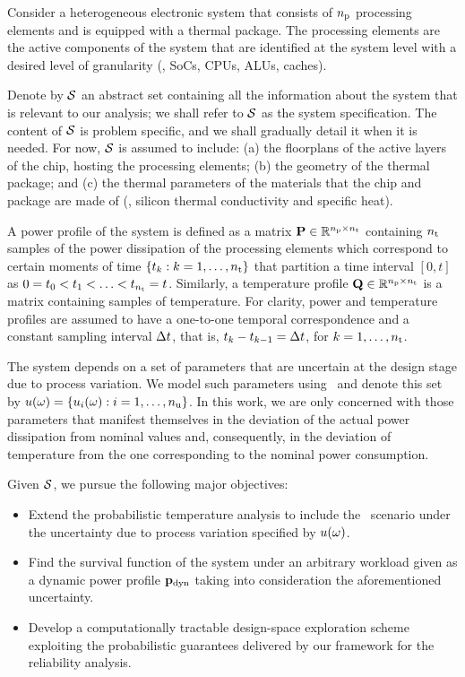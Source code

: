 Consider a heterogeneous electronic system that consists of ${n_\text{p}}$ processing elements and is equipped with a thermal package.
The processing elements are the active components of the system that are identified at the system level with a desired level of granularity (\eg, SoCs, CPUs, ALUs, caches).

Denote by $\mathcal{S}$ an abstract set containing all the information about the system that is relevant to our analysis; we shall refer to $\mathcal{S}$ as the system specification.
The content of $\mathcal{S}$ is problem specific, and we shall gradually detail it when it is needed.
For now, $\mathcal{S}$ is assumed to include: (a) the floorplans of the active layers of the chip, hosting the processing elements; (b) the geometry of the thermal package; and (c) the thermal parameters of the materials that the chip and package are made of (\eg, silicon thermal conductivity and specific heat).

A power profile of the system is defined as a matrix $\mathbf{P} \in \mathbb{R}^{{n_\text{p}} \times {n_\text{t}}}$ containing ${n_\text{t}}$ samples of the power dissipation of the processing elements which correspond to certain moments of time $\{ t_k: k = 1, \dots, {n_\text{t}} \}$ that partition a time interval $[0, t]$ as $0 = t_0 < t_1 < \dotsc < t_{n_\text{t}} = t$.
Similarly, a temperature profile $\mathbf{Q} \in \mathbb{R}^{{n_\text{p}} \times {n_\text{t}}}$ is a matrix containing samples of temperature.
For clarity, power and temperature profiles are assumed to have a one-to-one temporal correspondence and a constant sampling interval $\Delta t$, that is, $t_k - t_{k - 1} = \Delta t$, for $k = 1, \dots, {n_\text{t}}$.

The system depends on a set of parameters that are uncertain at the design stage due to process variation.
We model such parameters using \rvs\ and denote this set by $u(\omega) = \{ u_i(\omega): i = 1, \dots, {n_\text{u}} \}$.
In this work, we are only concerned with those parameters that manifest themselves in the deviation of the actual power dissipation from nominal values and, consequently, in the deviation of temperature from the one corresponding to the nominal power consumption.

Given $\mathcal{S}$, we pursue the following major objectives:
\begin{itemize}
  \item Extend the probabilistic temperature analysis to include the \dss\ scenario under the uncertainty due to process variation specified by $u(\omega)$.
  \item Find the survival function of the system under an arbitrary workload given as a dynamic power profile $\mathbf{p}_{\text{dyn}}$ taking into consideration the aforementioned uncertainty.
  \item Develop a computationally tractable design-space exploration scheme exploiting the probabilistic guarantees delivered by our framework for the reliability analysis.
\end{itemize}

